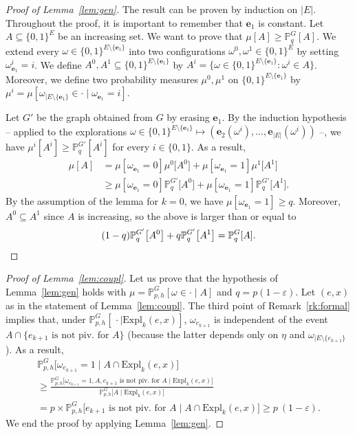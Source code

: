 \documentclass[AHL,Unicode,longabstracts,published]{cedram}
\newcommand{\Pro}{\mathbb{P}}
\newcommand{\ee}{\mathbf{e}}
\newcommand{\Expl}{\mathrm{Expl}}
\begin{document}
\begin{proof}[Proof of Lemma~\ref{lem:gen}]
The result can be proven by induction on $|E|$. Throughout the proof, it is important to remember that $\ee_1$ is constant. Let $A\subseteq\{0,1\}^E$ be an increasing set. We want to prove that $\mu[A]\ge\Pro^G_q[A]$. We extend every $\omega \in \{0,1\}^{E\setminus\{\ee_1\}}$ into two configurations $\omega^0,\omega^1\in\{0,1\}^E$ by setting $\omega^i_{\ee_1}=i$. We define $A^0,A^1\subseteq\{0,1\}^{E\setminus\{\ee_1\}}$ by $A^i=\{\omega \in \{0,1\}^{E\setminus\{\ee_1\}} : \omega^i \in A\}$. Moreover, we define two probability measures $\mu^0,\mu^1$ on $\{0,1\}^{E\setminus\{\ee_1\}}$ by $\mu^i=\mu[\omega_{|E\setminus\{\ee_1\}}\in\cdot\mid\omega_{\ee_1}=i]$.


Let $G'$ be the graph obtained from $G$ by erasing $\ee_1$. By the induction hypothesis -- applied to the explorations $\omega\in\{0,1\}^{E\setminus\{\ee_1\}}\mapsto(\ee_2(\omega^i),\dots,\ee_{|E|}(\omega^i))$ --, we have $\mu^i[A^i]\ge \Pro^{G'}_q[A^i]$ for every $i\in \{0,1\}$. As a result,
\begin{align*}
\mu[A] &=\mu[\omega_{\ee_1}=0]\mu^0\big[A^0\big]+ \mu[\omega_{\ee_1}=1]\mu^1\big[A^1\big]\\
&\ge \mu[\omega_{\ee_1}=0]\Pro_q^{G'} \big[A^0\big]+ \mu[\omega_{\ee_1}=1]\Pro_q^{G'} \big[A^1\big].
\end{align*}
By the assumption of the lemma for $k=0$, we have $ \mu[\omega_{\ee_1}=1] \ge q$. Moreover, $A^0\subseteq A^1$ since $A$ is increasing, so the above is larger than or equal to
\[
(1-q)\Pro_q^{G'} \big[A^0\big]+q \Pro_q^{G'} \big[A^1\big] = \Pro^G_q[A]. \qedhere
\]
\end{proof}

\begin{proof}[Proof of Lemma~\ref{lem:coupl}]
Let us prove that the hypothesis of Lemma~\ref{lem:gen} holds with $\mu=\Pro_{p,h}^G[\omega \in \cdot \mid A]$ and $q=p(1-\varepsilon)$. Let $(e,x)$ as in the statement of Lemma~\ref{lem:coupl}. The third point of Remark~\ref{rk:formal} implies that, under $\Pro_{p,h}^G [\, \cdot \mid \Expl_k(e,x) ]$, $\omega_{e_{k+1}}$ is independent of the event $A \cap \{ \text{$e_{k+1} $ is not piv. for $A$} \}$ (because the latter depends only on $\eta$ and $\omega_{|E\setminus\{e_{k+1}\}}$). As a result,
\pagebreak
\begin{multline*}
\Pro_{p,h}^G \big[\omega_{e_{k+1}} = 1 \; \big| \; A \cap \Expl_k(e,x) \big]\\
\ge \frac{\Pro_{p,h}^G \big[\omega_{e_{k+1}} = 1, A, \text{$e_{k+1} $ is not piv. for $A$} \; \big| \; \Expl_k(e,x) \big]}{\Pro_{p,h}^G \big[A \; \big| \; \Expl_k(e,x) \big]}\\
= p \times\Pro_{p,h}^G \big[\text{$e_{k+1} $ is not piv. for $A$} \; \big| \; A \cap \Expl_k(e,x) \big]\ge p~(1-\varepsilon).
\end{multline*}
We end the proof by applying Lemma~\ref{lem:gen}.
\end{proof}
\end{document}
